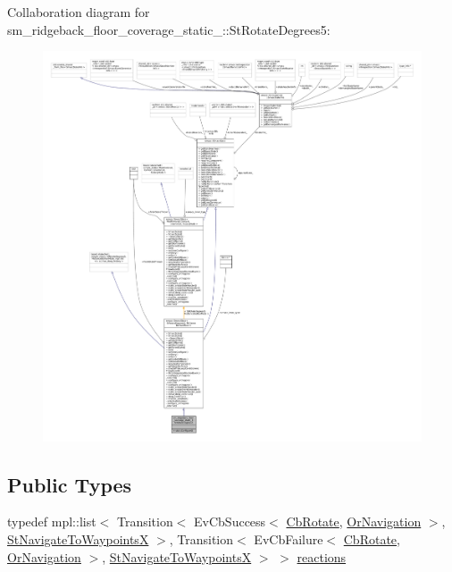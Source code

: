 Collaboration diagram for sm\+\_\+ridgeback\+\_\+floor\+\_\+coverage\+\_\+static\+\_\+:\+:St\+Rotate\+Degrees5\+:
\nopagebreak
\begin{figure}[H]
\begin{center}
\leavevmode
\includegraphics[width=350pt]{structsm__ridgeback__floor__coverage__static__1_1_1StRotateDegrees5__coll__graph}
\end{center}
\end{figure}
\subsection*{Public Types}
\begin{DoxyCompactItemize}
\item 
typedef mpl\+::list$<$ Transition$<$ Ev\+Cb\+Success$<$ \hyperlink{classcl__move__base__z_1_1CbRotate}{Cb\+Rotate}, \hyperlink{classsm__ridgeback__floor__coverage__static__1_1_1OrNavigation}{Or\+Navigation} $>$, \hyperlink{structsm__ridgeback__floor__coverage__static__1_1_1StNavigateToWaypointsX}{St\+Navigate\+To\+WaypointsX} $>$, Transition$<$ Ev\+Cb\+Failure$<$ \hyperlink{classcl__move__base__z_1_1CbRotate}{Cb\+Rotate}, \hyperlink{classsm__ridgeback__floor__coverage__static__1_1_1OrNavigation}{Or\+Navigation} $>$, \hyperlink{structsm__ridgeback__floor__coverage__static__1_1_1StNavigateToWaypointsX}{St\+Navigate\+To\+WaypointsX} $>$ $>$ \hyperlink{structsm__ridgeback__floor__coverage__static__1_1_1StRotateDegrees5_a8ca46411a40b4877268cca9c99b0703e}{reactions}
\end{DoxyCompactItemize}
